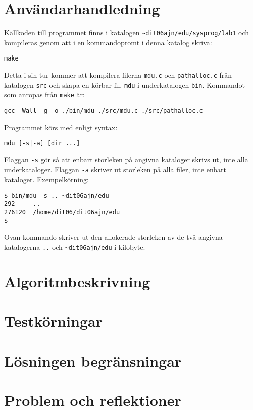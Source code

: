 \documentclass[a4paper, 12pt]{article}
\begin{document}
\section{Användarhandledning}\label{sec:anvandarhandledning}
Källkoden till programmet finns i katalogen
\verb!~dit06ajn/edu/sysprog/lab1! och kompileras genom att i en
kommandopromt i denna katalog skriva:

\verb!make!

Detta i sin tur kommer att kompilera filerna \verb!mdu.c! och
\verb!pathalloc.c! från katalogen \verb!src! och skapa en körbar fil,
\verb!mdu! i underkatalogen \verb!bin!. Kommandot som anropas från
\verb!make! är:

\verb!gcc -Wall -g -o ./bin/mdu ./src/mdu.c ./src/pathalloc.c!

Programmet körs med enligt syntax:

\verb!mdu [-s|-a] [dir ...]!

Flaggan \verb!-s! gör så att enbart storleken på angivna kataloger
skrivs ut, inte alla underkataloger. Flaggan \verb!-a!  skriver ut
storleken på alla filer, inte enbart kataloger. Exempelkörning:

\begin{verbatim}
$ bin/mdu -s .. ~dit06ajn/edu
292     ..
276120  /home/dit06/dit06ajn/edu
$
\end{verbatim}

Ovan kommando skriver ut den allokerade storleken av de två angivna
katalogerna \verb!..! och \verb!~dit06ajn/edu! i kilobyte.

% 
% 

\section{Algoritmbeskrivning}\label{sec:algoritmbeskrivning}

\section{Testkörningar}\label{sec:testkorningar}

\section{Lösningen begränsningar}\label{sec:losningensbegransningar}

\section{Problem och reflektioner}\label{sec:problemochreflektioner}
\end{document}
